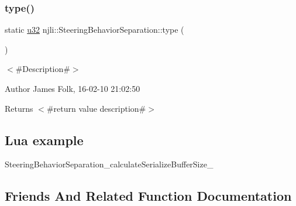 \mbox{\label{classnjli_1_1_steering_behavior_separation_ab8ccfe7e3fd366d5e3d5dd4786cc2736}} 
\subsubsection{\texorpdfstring{type()}{type()}}
{\footnotesize\ttfamily static \mbox{\hyperlink{_util_8h_a10e94b422ef0c20dcdec20d31a1f5049}{u32}} njli\+::\+Steering\+Behavior\+Separation\+::type (\begin{DoxyParamCaption}{ }\end{DoxyParamCaption})\hspace{0.3cm}{\ttfamily [static]}}



$<$\#\+Description\#$>$ 

\begin{DoxyAuthor}{Author}
James Folk, 16-\/02-\/10 21\+:02\+:50
\end{DoxyAuthor}
\begin{DoxyReturn}{Returns}
$<$\#return value description\#$>$
\end{DoxyReturn}
\hypertarget{classnjli_1_1_steering_behavior_wander_ex1}{}\subsection{Lua example}\label{classnjli_1_1_steering_behavior_wander_ex1}

\begin{DoxyCodeInclude}
\end{DoxyCodeInclude}
Steering\+Behavior\+Separation\+\_\+calculate\+Serialize\+Buffer\+Size\+\_\+ 

\subsection{Friends And Related Function Documentation}
\mbox{\label{classnjli_1_1_steering_behavior_separation_acb96ebb09abe8f2a37a915a842babfac}} 
